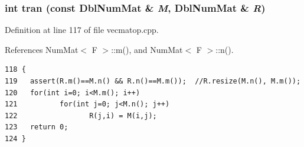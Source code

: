 \subsubsection{\setlength{\rightskip}{0pt plus 5cm}int tran (const {\bf Dbl\-Num\-Mat} \& {\em M}, {\bf Dbl\-Num\-Mat} \& {\em R})}\label{vecmatop_8cpp_2db1bb0aad5cb3c8b5155fb7f23d7b38_2db1bb0aad5cb3c8b5155fb7f23d7b38}




Definition at line 117 of file vecmatop.cpp.

References Num\-Mat$<$ F $>$::m(), and Num\-Mat$<$ F $>$::n().

\footnotesize\begin{verbatim}118 {
119   assert(R.m()==M.n() && R.n()==M.m());  //R.resize(M.n(), M.m());
120   for(int i=0; i<M.m(); i++)
121          for(int j=0; j<M.n(); j++)
122                 R(j,i) = M(i,j);
123   return 0;
124 }
\end{verbatim}\normalsize 


